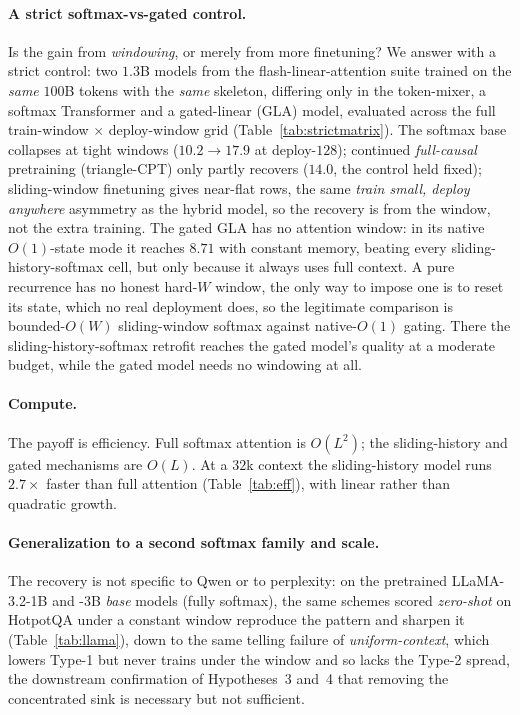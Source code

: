 \documentclass[letterpaper]{article} %
\begin{document}
\paragraph{A strict softmax-vs-gated control.} Is the gain from \emph{windowing}, or merely from more finetuning? We answer with a strict control: two $1.3$B models from the flash-linear-attention suite trained on the \emph{same} $100$B tokens with the \emph{same} skeleton, differing only in the token-mixer, a softmax Transformer and a gated-linear (GLA) model, evaluated across the full train-window $\times$ deploy-window grid (Table~\ref{tab:strictmatrix}). The softmax base collapses at tight windows ($10.2\!\to\!17.9$ at deploy-$128$); continued \emph{full-causal} pretraining (triangle-CPT) only partly recovers ($14.0$, the control held fixed); sliding-window finetuning gives near-flat rows, the same \emph{train small, deploy anywhere} asymmetry as the hybrid model, so the recovery is from the window, not the extra training. The gated GLA has no attention window: in its native $O(1)$-state mode it reaches $8.71$ with constant memory, beating every sliding-history-softmax cell, but only because it always uses full context. A pure recurrence has no honest hard-$W$ window, the only way to impose one is to reset its state, which no real deployment does, so the legitimate comparison is bounded-$O(W)$ sliding-window softmax against native-$O(1)$ gating. There the sliding-history-softmax retrofit reaches the gated model's quality at a moderate budget, while the gated model needs no windowing at all.



\paragraph{Compute.} The payoff is efficiency. Full softmax attention is $O(L^2)$; the sliding-history and gated mechanisms are $O(L)$. At a $32$k context the sliding-history model runs $2.7\times$ faster than full attention (Table~\ref{tab:eff}), with linear rather than quadratic growth.



\paragraph{Generalization to a second softmax family and scale.} The recovery is not specific to Qwen or to perplexity: on the pretrained LLaMA-3.2-1B and -3B \emph{base} models (fully softmax), the same schemes scored \emph{zero-shot} on HotpotQA under a constant window reproduce the pattern and sharpen it (Table~\ref{tab:llama}), down to the same telling failure of \emph{uniform-context}, which lowers Type-1 but never trains under the window and so lacks the Type-2 spread, the downstream confirmation of Hypotheses~3 and~4 that removing the concentrated sink is necessary but not sufficient.
\end{document}
